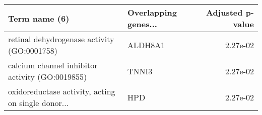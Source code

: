 \begin{tabular}{llr}
\toprule
                                     Term name (6) & Overlapping genes... &  Adjusted p-value \\
\midrule
       retinal dehydrogenase activity (GO:0001758) &              ALDH8A1 &          2.27e-02 \\
   calcium channel inhibitor activity (GO:0019855) &                TNNI3 &          2.27e-02 \\
oxidoreductase activity, acting on single donor... &                  HPD &          2.27e-02 \\
\bottomrule
\end{tabular}
